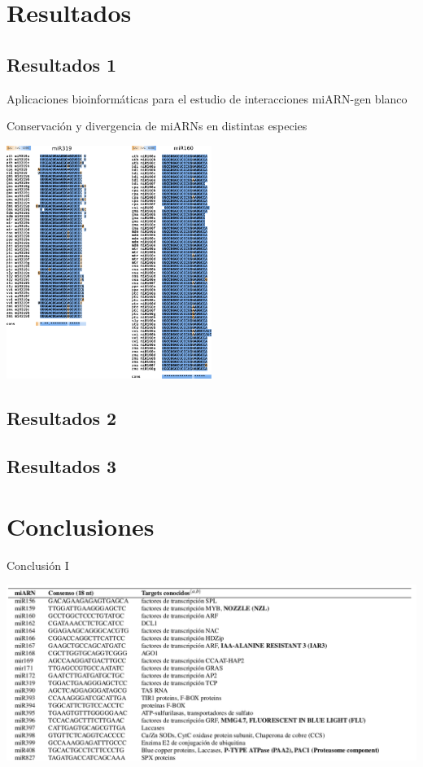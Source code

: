 \documentclass{beamer}
\begin{document}
\section{Resultados}

\subsection{Resultados 1}

\begin{frame}{Aplicaciones bioinformáticas para el estudio de interacciones miARN-gen blanco}
\end{frame}

\begin{frame}{Conservación y divergencia de miARNs en distintas especies}
	\begin{center}
		\includegraphics[width=0.5\textwidth]{img/variabilidad_maduro.png}
	\end{center}
\end{frame}

\subsection{Resultados 2}

\subsection{Resultados 3}


\section{Conclusiones}


\begin{frame}{Conclusión I}
	\begin{center}
		\includegraphics[width=1\textwidth]{img/miRNAs_y_genes_blancos.png}
	\end{center}
\end{frame}
\end{document}
